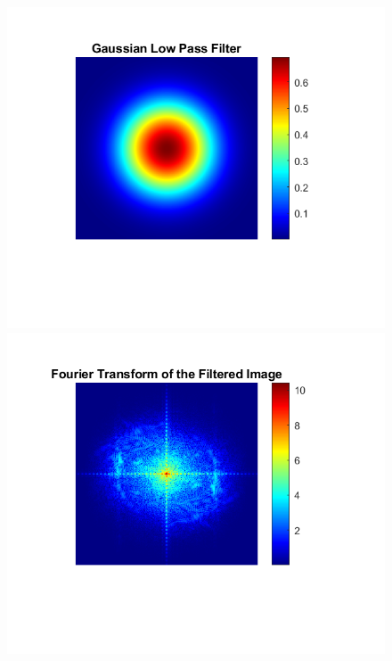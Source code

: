 \documentclass{article}
\begin{document}
\begin{figure}[!htb]
    \centering
    \begin{minipage}[b]{0.3\textwidth}
        \includegraphics[width=\textwidth]{Gaussian_Low_Pass_Filter_80.png}
    \end{minipage}
    \begin{minipage}[b]{0.3\textwidth}
        \includegraphics[width=\textwidth]{Gaussian_Fourier_Transform_Filtered_80.png}

\end{minipage}
\end{figure}
\end{document}
